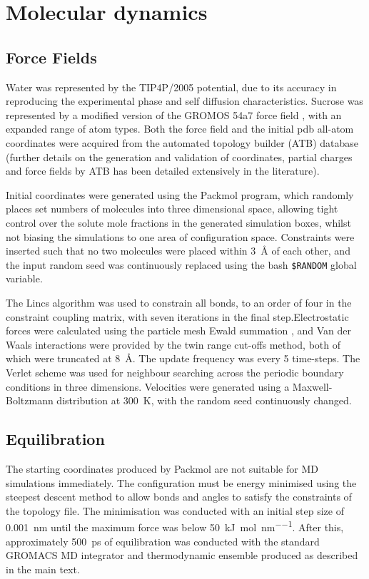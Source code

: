 \section{Molecular dynamics}
\subsection{Force Fields}
Water was represented by the TIP4P/2005 \cite{abascalGeneralPurposeModel2005} potential, due to its accuracy in reproducing the experimental phase and self diffusion characteristics. Sucrose was represented by a modified version of the GROMOS 54a7 force field \cite{oostenbrinkBiomolecularForceField2004}, with an expanded range of atom types. Both the force field and the initial pdb all-atom coordinates were acquired from the automated topology builder (ATB) database \cite{koziaraTestingValidationAutomated2014} (further details on the generation \cite{maldeAutomatedForceField2011} and validation \cite{schmidDefinitionTestingGROMOS2011} of coordinates, partial charges and force fields by ATB has been detailed extensively in the literature).

Initial coordinates were generated using the Packmol \cite{martinez2009packmol} program, which randomly places set numbers of molecules into three dimensional space, allowing tight control over the solute mole fractions in the generated simulation boxes, whilst not biasing the simulations to one area of configuration space. Constraints were inserted such that no two molecules were placed within \SI{3}{\angstrom} of each other, and the input random seed was continuously replaced using the bash \texttt{\$RANDOM} global variable. 

The Lincs algorithm \cite{hess1997lincs} was used to constrain all bonds, to an order of four in the constraint coupling matrix, with seven iterations in the final step.Electrostatic forces were calculated using the particle mesh Ewald summation \cite{essmannSmoothParticleMesh1995}, and Van der Waals interactions were provided by the twin range cut-offs method, both of which were truncated at \SI{8}{\angstrom}. The update frequency was every \num{5} time-steps. The Verlet scheme \cite{pallFlexibleAlgorithmCalculating2013} was used for neighbour searching across the periodic boundary conditions in three dimensions. Velocities were generated using a Maxwell-Boltzmann distribution at \SI{300}{\kelvin}, with the random seed continuously changed.

\subsection{Equilibration}
 The starting coordinates produced by Packmol \cite{martinez2009packmol} are not suitable for MD simulations immediately. The configuration must be energy minimised using the steepest descent method to allow bonds and angles to satisfy the constraints of the topology file. The minimisation was conducted with an initial step size of \SI{0.001}{\nano\meter} until the maximum force was below \SI{50}{\kilo\joule\per\mole\per\nano\meter}. After this, approximately \SI{500}{\pico\second} of equilibration was conducted with the standard GROMACS MD integrator and thermodynamic ensemble produced as described in the main text. 

